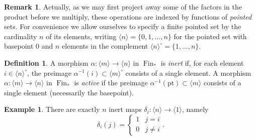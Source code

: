 \documentclass{article}
\theoremstyle{definition}
\newtheorem{definition}{Definition}[subsection]
\newtheorem{example}{Example}[subsection]
\newtheorem{remark}{Remark}[subsection]
\DeclareMathOperator{\Fin}{Fin}
\newcommand{\pt}{\mathrm{pt}}
\begin{document}
\begin{remark}
Actually, as we may first project away some of the factors in the product before we multiply, these operations are indexed by functions of  {\em pointed} sets.
For convenience we allow ourselves to specify a finite pointed set by the cardinality $n$ of its elements, writing $\langle n\rangle=\{0,1,\ldots,n\}$ for the pointed set with basepoint $0$ and $n$ elements in the complement $\langle n\rangle^\circ=\{1,\ldots,n\}$.
\end{remark}
\begin{definition}
A morphism $\alpha:\langle m\rangle\to \langle n\rangle$ in $\Fin_*$ is {\em inert}
\index{inert map!in $\Fin_*$}
if, for each element $i\in\langle n\rangle^\circ$, the preimage $\alpha^{-1}(i)\subset\langle m\rangle^\circ$ consists of a single element.
A morphism $\alpha:\langle m\rangle\to \langle n\rangle$ in $\Fin_*$ is {\em active}
if the preimage $\alpha^{-1}(\pt)\subset\langle m\rangle$ consists of a single element (necessarily the basepoint).
\end{definition}

\begin{example}
There are exactly $n$ inert maps $\delta_i:\langle n\rangle\to\langle 1\rangle$, namely
\[
\delta_i(j)=\begin{cases} 
      1 & j=i \\
      0 & j\neq i
   \end{cases}.
\]
\end{example}
\end{document}
